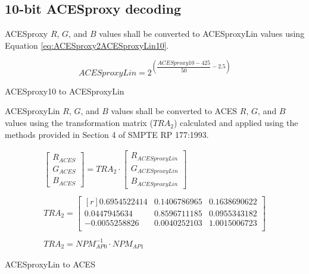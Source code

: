 \subsection{10-bit ACESproxy decoding}
ACESproxy $R$, $G$, and $B$ values shall be converted to ACESproxyLin values using Equation \ref{eq:ACESproxy2ACESproxyLin10}.

\begin{floatequ} 
\begin{equation} 
    ACESproxyLin = 2^{\left(\dfrac{ACESproxy10-425}{50}-2.5\right)}
\end{equation}
\caption{ACESproxy10 to ACESproxyLin}
\label{eq:ACESproxy2ACESproxyLin10}
\end{floatequ}

ACESproxyLin $R$, $G$, and $B$ values shall be converted to ACES $R$, $G$, and $B$ values using the transformation matrix ($TRA_{2}$) calculated and applied using the methods provided in Section 4 of SMPTE RP 177:1993.


\begin{floatequ} 
\begin{gather}
    \begin{bmatrix}
        R_{ACES}\\
        G_{ACES}\\
        B_{ACES}
    \end{bmatrix}
    =
    TRA_{2}
    \cdot
    \begin{bmatrix}
        R_{ACESproxyLin}\\
        G_{ACESproxyLin}\\
        B_{ACESproxyLin}
    \end{bmatrix} \\
    \\
    TRA_{2} =
    \begin{bmatrix*}[r]
        0.6954522414 & 0.1406786965 & 0.1638690622 \\
        0.0447945634 & 0.8596711185 & 0.0955343182 \\
        -0.0055258826 & 0.0040252103 & 1.0015006723 \\
    \end{bmatrix*} \\
    \\
    TRA_{2} = NPM^{-1}_{AP0} \cdot NPM_{AP1}
\end{gather}
\caption{ACESproxyLin to ACES}
\label{eq:ACESproxyLin2ACES10}
\end{floatequ}


